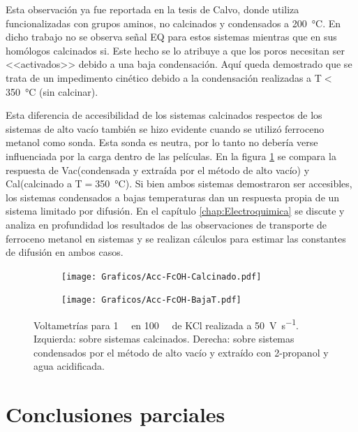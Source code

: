      Esta observación ya fue reportada en la tesis de Calvo\cite{Calvo20210}, donde utiliza \pdmF\space funcionalizadas con grupos aminos, no calcinados y condensados a \SI{200}{\celsius}. En dicho trabajo no se observa señal EQ para estos sistemas mientras que en sus homólogos calcinados si. Este hecho se lo atribuye a que los poros necesitan ser <<activados>> debido a una baja condensación. Aquí queda demostrado que se trata de un impedimento cinético debido a la condensación realizadas a T$<$\SI{350}{\celsius} (sin calcinar).

      Esta diferencia de accesibilidad de los sistemas calcinados respectos de los sistemas de alto vacío también se hizo evidente cuando se utilizó ferroceno metanol como sonda. Esta sonda es neutra, por lo tanto no debería verse influenciada por la carga dentro de las películas. En la figura \ref{fig:fcOH_accesibilidad} se compara la respuesta de Vac\pdmF\space (condensada y extraída por el método de alto vacío) y Cal\pdmF\space (calcinado a T$=$\SI{350}{\celsius}). Si bien ambos sistemas demostraron ser accesibles, los sistemas condensados a bajas temperaturas dan un respuesta propia de un sistema limitado por difusión. En el capítulo \ref{chap:Electroquimica} se discute y analiza en profundidad los resultados de las observaciones de transporte de ferroceno metanol en sistemas \pdmF y se realizan cálculos para estimar las constantes de difusión en ambos casos.

      		\begin{figure}[ht!]
		 	\begin{subfigure}[t]{0.5\textwidth}
		          	\texttt{[image: Graficos/Acc-FcOH-Calcinado.pdf]}
		          	\end{subfigure}
		    \begin{subfigure}[t]{0.5\textwidth}
		          	\texttt{[image: Graficos/Acc-FcOH-BajaT.pdf]}
		         	\end{subfigure}
		         	\caption[Voltagrama comparativo SF calcinados/alto vacío II]{Voltametrías para \fc\space \SI{1}{\milli\Molar} en \SI{100}{\milli\Molar} de KCl realizada a \SI{50}{\volt\per\second}. Izquierda: sobre sistemas \pdmF\space calcinados. Derecha: sobre sistemas \pdmF\space condensados por el método de alto vacío y extraído con 2-propanol y agua acidificada.}
		         	\label{fig:fcOH_accesibilidad}
		    \end{figure}     	

\section{Conclusiones parciales}
	
